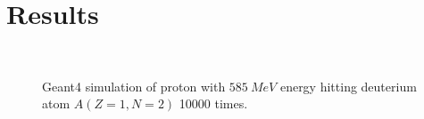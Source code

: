 \section{Results}
\label{results}


\begin{figure}
  \begin{center}
    \leavevmode
    \mbox{\epsfxsize=13cm  }
       \caption{ Geant4 simulation of proton with $585~MeV$ energy hitting deuterium atom $A(Z = 1,N = 2)$ 10000 times.}
  \label{pic:z001n002p001e000585c010h000}
  \end{center}
\end{figure}


